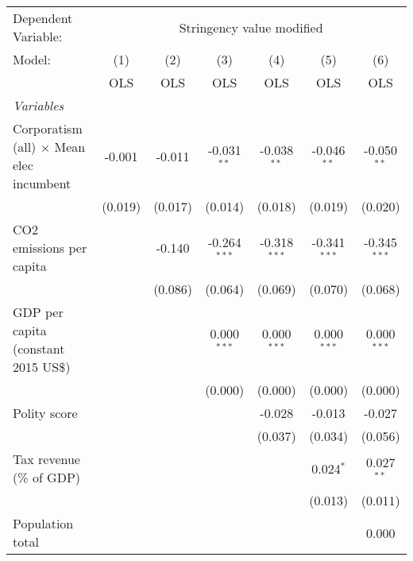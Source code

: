 
\begingroup
\centering
\begin{tabular}{lcccccc}
   \toprule
   Dependent Variable: & \multicolumn{6}{c}{Stringency value modified}\\
   Model:                                          & (1)     & (2)     & (3)            & (4)            & (5)            & (6)\\  
                                                   &  OLS    & OLS     & OLS            & OLS            & OLS            & OLS\\  
   \midrule
   \emph{Variables}\\
   Corporatism (all) $\times$ Mean elec incumbent  & -0.001  & -0.011  & -0.031$^{**}$  & -0.038$^{**}$  & -0.046$^{**}$  & -0.050$^{**}$\\   
                                                   & (0.019) & (0.017) & (0.014)        & (0.018)        & (0.019)        & (0.020)\\   
   CO2 emissions per capita                        &         & -0.140  & -0.264$^{***}$ & -0.318$^{***}$ & -0.341$^{***}$ & -0.345$^{***}$\\   
                                                   &         & (0.086) & (0.064)        & (0.069)        & (0.070)        & (0.068)\\   
   GDP per capita (constant 2015 US\$)             &         &         & 0.000$^{***}$  & 0.000$^{***}$  & 0.000$^{***}$  & 0.000$^{***}$\\   
                                                   &         &         & (0.000)        & (0.000)        & (0.000)        & (0.000)\\   
   Polity score                                    &         &         &                & -0.028         & -0.013         & -0.027\\   
                                                   &         &         &                & (0.037)        & (0.034)        & (0.056)\\   
   Tax revenue (\% of GDP)                         &         &         &                &                & 0.024$^{*}$    & 0.027$^{**}$\\   
                                                   &         &         &                &                & (0.013)        & (0.011)\\   
   Population total                                &         &         &                &                &                & 0.000\\   

\end{tabular}
